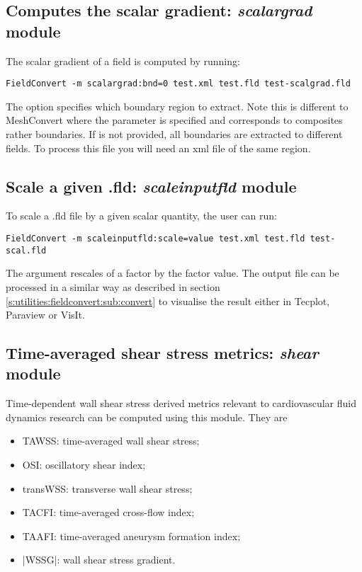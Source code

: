 \subsection{Computes the scalar gradient: \textit{scalargrad} module}
The scalar gradient of a field is computed by running:
\begin{lstlisting}[style=BashInputStyle] 
FieldConvert -m scalargrad:bnd=0 test.xml test.fld test-scalgrad.fld
\end{lstlisting}
The option  specifies which boundary region to extract. Note this is different to MeshConvert where the parameter  is specified and corresponds to composites rather boundaries. If  is not provided, all boundaries are extracted to different fields. To process this file you will need an xml file of the same region. 

%
%
%

\subsection{Scale a given .fld: \textit{scaleinputfld} module}
To scale a .fld file by a given scalar quantity, the user can run:
\begin{lstlisting}[style=BashInputStyle] 
FieldConvert -m scaleinputfld:scale=value test.xml test.fld test-scal.fld
\end{lstlisting}
The argument  rescales of a factor  
 by the factor value.
The output file  can be processed in a similar 
way as described in section \ref{s:utilities:fieldconvert:sub:convert}
to visualise the result  either in Tecplot, Paraview or VisIt.

%
%
%
\subsection{Time-averaged shear stress metrics: \textit{shear} module}
Time-dependent wall shear stress derived metrics relevant to cardiovascular fluid dynamics research can be computed using this module. They are

\begin{itemize}
\item TAWSS: time-averaged wall shear stress;
\item OSI: oscillatory shear index;
\item transWSS: transverse wall shear stress;
\item TACFI: time-averaged cross-flow index;
\item TAAFI: time-averaged aneurysm formation index;
\item |WSSG|: wall shear stress gradient.
\end{itemize}

